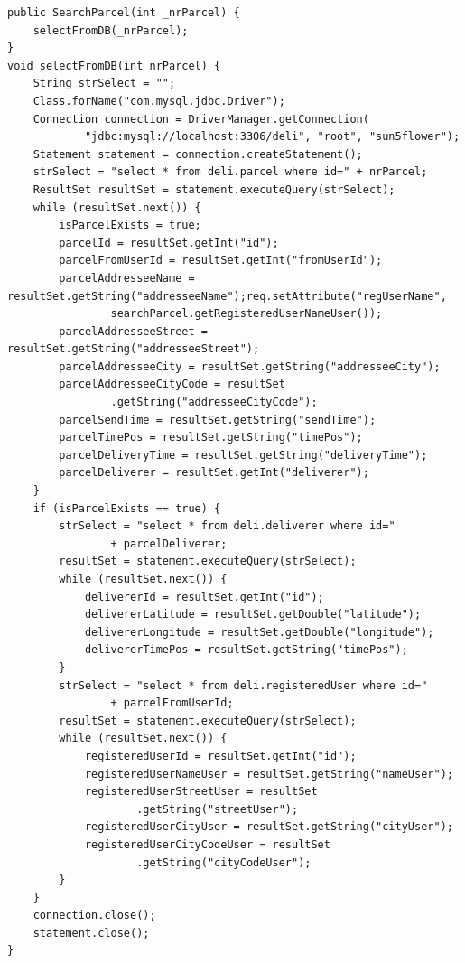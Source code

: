 \documentclass[eng,printmode,oneside]{mgr}
\begin{document}
\newpage
{} 
\begin{lstlisting}[caption=Klasa SearchParcel.java przedstawiona metoda
selectFromDB()\, która reprezentuje połączenie z bazą danych oraz pobiera
wszystkie dane o przesyłce,label=lst:SearchParcel.selectFromDB.java]
public SearchParcel(int _nrParcel) {
	selectFromDB(_nrParcel); 
}
void selectFromDB(int nrParcel) {
	String strSelect = "";
	Class.forName("com.mysql.jdbc.Driver");
	Connection connection = DriverManager.getConnection(
			"jdbc:mysql://localhost:3306/deli", "root", "sun5flower");
	Statement statement = connection.createStatement();
	strSelect = "select * from deli.parcel where id=" + nrParcel;
	ResultSet resultSet = statement.executeQuery(strSelect);
	while (resultSet.next()) {
		isParcelExists = true;
		parcelId = resultSet.getInt("id");
		parcelFromUserId = resultSet.getInt("fromUserId");
		parcelAddresseeName = resultSet.getString("addresseeName");req.setAttribute("regUserName",
				searchParcel.getRegisteredUserNameUser());
		parcelAddresseeStreet = resultSet.getString("addresseeStreet");
		parcelAddresseeCity = resultSet.getString("addresseeCity");
		parcelAddresseeCityCode = resultSet
				.getString("addresseeCityCode");
		parcelSendTime = resultSet.getString("sendTime");
		parcelTimePos = resultSet.getString("timePos");
		parcelDeliveryTime = resultSet.getString("deliveryTime");
		parcelDeliverer = resultSet.getInt("deliverer");
	}
	if (isParcelExists == true) {
		strSelect = "select * from deli.deliverer where id="
				+ parcelDeliverer;
		resultSet = statement.executeQuery(strSelect);
		while (resultSet.next()) {
			delivererId = resultSet.getInt("id");
			delivererLatitude = resultSet.getDouble("latitude");
			delivererLongitude = resultSet.getDouble("longitude");
			delivererTimePos = resultSet.getString("timePos");
		}
		strSelect = "select * from deli.registeredUser where id="
				+ parcelFromUserId;
		resultSet = statement.executeQuery(strSelect);
		while (resultSet.next()) {
			registeredUserId = resultSet.getInt("id");
			registeredUserNameUser = resultSet.getString("nameUser");
			registeredUserStreetUser = resultSet
					.getString("streetUser");
			registeredUserCityUser = resultSet.getString("cityUser");
			registeredUserCityCodeUser = resultSet
					.getString("cityCodeUser");
		}
	}
	connection.close();
	statement.close();
}
\end{lstlisting}
\end{document}
